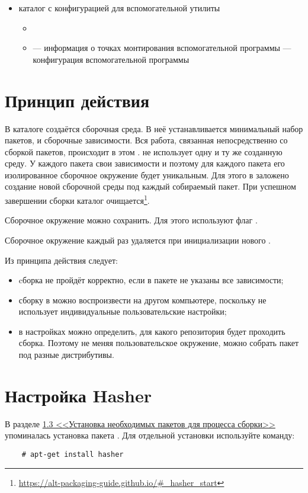 \begin{itemize}
	\item {} каталог с конфигурацией для вспомогательной утилиты 
	\begin{itemize}
		\item {}
		\item {} --- информация о точках монтирования вспомогательной программы 
		 --- конфигурация вспомогательной программы 
	\end{itemize} 
\end{itemize}


\section{Принцип действия}
В каталоге  создаётся сборочная среда. В неё устанавливается минимальный набор пакетов,  и сборочные зависимости. Вся работа, связанная непосредственно со сборкой пакетов, происходит в этом .  не использует одну и ту же созданную среду. У каждого пакета свои зависимости и поэтому для каждого пакета его изолированное сборочное окружение будет уникальным. Для этого в  заложено создание новой сборочной среды под каждый собираемый пакет. При успешном завершении сборки каталог  очищается\footnote{\href{https://alt-packaging-guide.github.io/\#_hasher_start}{https://alt-packaging-guide.github.io/\#\_hasher\_start}}.

Сборочное окружение можно сохранить. Для этого используют флаг .

Сборочное окружение каждый раз удаляется при инициализации нового .

Из принципа действия  следует:
\begin{itemize}
	\item cборка не пройдёт корректно, если в пакете не указаны все зависимости;
	\item сборку в  можно воспроизвести на другом компьютере, поскольку  не использует индивидуальные пользовательские настройки;
	\item в настройках можно определить, для какого репозитория будет проходить сборка. Поэтому не меняя пользовательское окружение, можно собрать пакет под разные дистрибутивы.
\end{itemize}


\hypertarget{5.3}{\section{Настройка Hasher}}
В разделе \hyperlink{1.3}{1.3 <<Установка необходимых пакетов для процесса сборки>>}  упоминалась установка пакета . Для отдельной установки используйте команду: 
\begin{verbatim}
	# apt-get install hasher
\end{verbatim}

